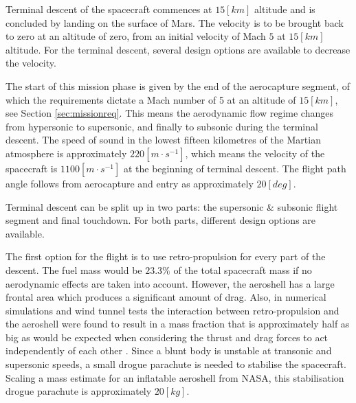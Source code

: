 Terminal descent of the spacecraft commences at $15 [km]$ altitude and is concluded by landing on the surface of Mars. The velocity is to be brought back to zero at an altitude of zero, from an initial velocity of Mach $5$ at $15 [km]$ altitude. For the terminal descent, several design options are available to decrease the velocity.%

The start of this mission phase is given by the end of the aerocapture segment, of which the requirements dictate a Mach number of 5 at an altitude of $15 \left[km\right]$, see Section \ref{sec:missionreq}. This means the aerodynamic flow regime changes from hypersonic to supersonic, and finally to subsonic during the terminal descent. The speed of sound in the lowest fifteen kilometres of the Martian atmosphere is approximately $220 \left[m\cdot s^{-1}\right]$, which means the velocity of the spacecraft is $1100 \left[m\cdot s^{-1}\right]$ at the beginning of terminal descent. The flight path angle follows from aerocapture and entry as approximately $20 \left[deg\right]$.%

Terminal descent can be split up in two parts: the supersonic \& subsonic flight segment and final touchdown. For both parts, different design options are available.

The first option for the flight is to use retro-propulsion for every part of the descent. The fuel mass would be $23.3\%$ of the total spacecraft mass if no aerodynamic effects are taken into account. However, the aeroshell has a large frontal area which produces a significant amount of drag. Also, in numerical simulations and wind tunnel tests the interaction between retro-propulsion and the aeroshell were found to result in a mass fraction that is approximately half as big as would be expected when considering the thrust and drag forces to act independently of each other \cite{Korzun2009}. Since a blunt body is unstable at transonic and supersonic speeds, a small drogue parachute is needed to stabilise the spacecraft. Scaling a mass estimate for an inflatable aeroshell from NASA, this stabilisation drogue parachute is approximately $20 [kg]$.

